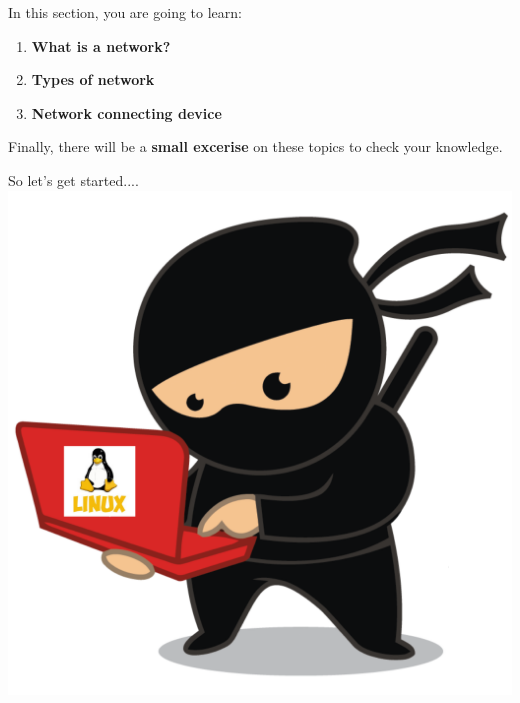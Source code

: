 \setlength{\columnsep}{3pt}
\begin{flushleft}
	\bigskip
	\bigskip
	\begin{tcolorbox}[breakable,notitle,boxrule=1pt,colback=black,colframe=black]
		\color{white}
		\bigskip
		In this section, you are going to learn:
		\begin{enumerate}
			\item \textbf{What is a network?}
			\item \textbf{Types of network}
			\item \textbf{Network connecting device}
		\end{enumerate}	
		\bigskip
		Finally, there will be a \textbf{small excerise} on these topics to check your knowledge.
		\bigskip
	\end{tcolorbox}
	
	
	\begin{multicols}{2}
		\vspace*{\fill}
		\vspace*{\fill}
		\vspace*{\fill}
		\vspace*{\fill}
		\vspace*{\fill}
		\vspace*{\fill}
		\vspace*{\fill}
		\vspace*{\fill}
		\vspace*{\fill}
		
		\vfill \null
		\columnbreak
		So let's get started....
		\includegraphics[scale=0.08]{content/linux_section.png}
	\end{multicols}	
	
\end{flushleft}

\newpage

